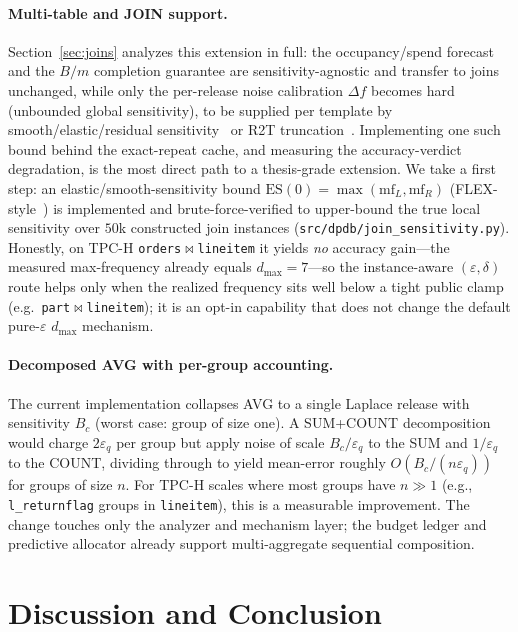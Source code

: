 \documentclass[sigconf,nonacm]{acmart}
\newcommand{\eps}{\varepsilon}
\begin{document}
\paragraph{Multi-table and JOIN support.}
Section~\ref{sec:joins} analyzes this extension in full: the occupancy/spend forecast and the $B/m$ completion guarantee are sensitivity-agnostic and transfer to joins unchanged, while only the per-release noise calibration $\Delta f$ becomes hard (unbounded global sensitivity), to be supplied per template by smooth/elastic/residual sensitivity~\cite{nissim2007smooth,johnson2018towards,dong2021residual} or R2T truncation~\cite{dong2022r2t}. Implementing one such bound behind the exact-repeat cache, and measuring the accuracy-verdict degradation, is the most direct path to a thesis-grade extension. We take a first step: an elastic/smooth-sensitivity bound $\mathrm{ES}(0){=}\max(\mathrm{mf}_L,\mathrm{mf}_R)$ (FLEX-style~\cite{johnson2018towards}) is implemented and brute-force-verified to upper-bound the true local sensitivity over $50$k constructed join instances (\texttt{src/dpdb/join\_sensitivity.py}). Honestly, on TPC-H \texttt{orders}$\bowtie$\texttt{lineitem} it yields \emph{no} accuracy gain---the measured max-frequency already equals $d_{\max}{=}7$---so the instance-aware $(\eps,\delta)$ route helps only when the realized frequency sits well below a tight public clamp (e.g.\ \texttt{part}$\bowtie$\texttt{lineitem}); it is an opt-in capability that does not change the default pure-$\eps$ $d_{\max}$ mechanism.

\paragraph{Decomposed AVG with per-group accounting.}
The current implementation collapses AVG to a single Laplace release with sensitivity $B_c$ (worst case: group of size one). A SUM+COUNT decomposition would charge $2\eps_q$ per group but apply noise of scale $B_c/\eps_q$ to the SUM and $1/\eps_q$ to the COUNT, dividing through to yield mean-error roughly $O(B_c/(n\eps_q))$ for groups of size $n$. For TPC-H scales where most groups have $n \gg 1$ (e.g., \texttt{l\_returnflag} groups in \texttt{lineitem}), this is a measurable improvement. The change touches only the analyzer and mechanism layer; the budget ledger and predictive allocator already support multi-aggregate sequential composition.

\section{Discussion and Conclusion}
\label{sec:discussion}
\end{document}
